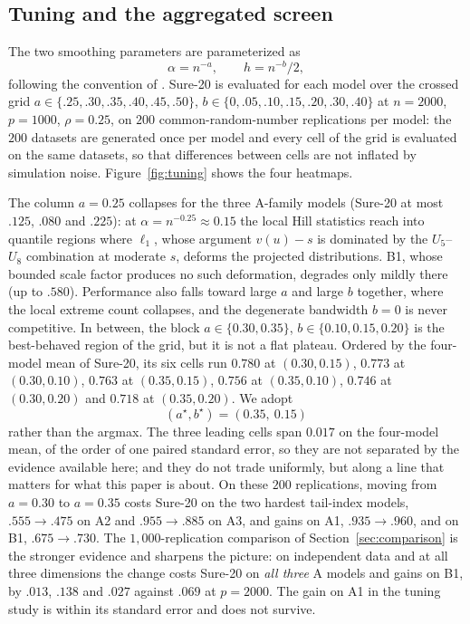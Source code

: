 \subsection{Tuning and the aggregated screen}\label{sec:tuning}

The two smoothing parameters are parameterized as
\[
 \alpha=n^{-a},\qquad h=n^{-b}/2,
\]
following the convention of \citet{gardesPodgorny2025}. Sure-20 is
evaluated for each model over the crossed grid
$a\in\{.25,.30,.35,.40,.45,.50\}$,
$b\in\{0,.05,.10,.15,.20,.30,.40\}$ at $n=2000$, $p=1000$,
$\rho=0.25$, on $200$ common-random-number replications per model: the
$200$ datasets are generated once per model and every cell of the grid
is evaluated on the same datasets, so that differences between cells
are not inflated by simulation noise. Figure~\ref{fig:tuning} shows the
four heatmaps.

The column $a=0.25$ collapses for the three A-family models (Sure-20 at
most $.125$, $.080$ and $.225$): at $\alpha=n^{-0.25}\approx0.15$ the
local Hill statistics reach into quantile regions where $\ell_1$, whose
argument $v(u)-s$ is dominated by the $U_5$--$U_8$ combination at
moderate $s$, deforms the projected distributions. B1, whose bounded
scale factor produces no such deformation, degrades only mildly there
(up to $.580$). Performance also falls toward large $a$ and large $b$
together, where the local extreme count collapses, and the degenerate
bandwidth $b=0$ is never competitive. In between, the block
$a\in\{0.30,0.35\}$, $b\in\{0.10,0.15,0.20\}$ is the best-behaved
region of the grid, but it is not a flat plateau. Ordered by the
four-model mean of Sure-20, its six cells run
$0.780$ at $(0.30,0.15)$, $0.773$ at $(0.30,0.10)$, $0.763$ at
$(0.35,0.15)$, $0.756$ at $(0.35,0.10)$, $0.746$ at $(0.30,0.20)$ and
$0.718$ at $(0.35,0.20)$. We adopt
\[
 (a^\star,b^\star)=(0.35,\ 0.15)
\]
rather than the argmax. The three leading cells span $0.017$ on the
four-model mean, of the order of one paired standard error, so they are
not separated by the evidence available here; and they do not trade
uniformly, but along a line that matters for what this paper is about.
On these $200$ replications, moving from
$a=0.30$ to $a=0.35$ costs Sure-20 on the two hardest tail-index models,
$.555\to.475$ on A2 and $.955\to.885$ on A3, and gains on A1,
$.935\to.960$, and on B1, $.675\to.730$. The $1{,}000$-replication
comparison of Section~\ref{sec:comparison} is the stronger evidence and
sharpens the picture: on independent data and at all three dimensions the
change costs Sure-20 on \emph{all three} A models and gains on B1, by
$.013$, $.138$ and $.027$ against $.069$ at $p=2000$. The gain on A1 in
the tuning study is within its standard error and does not survive.

